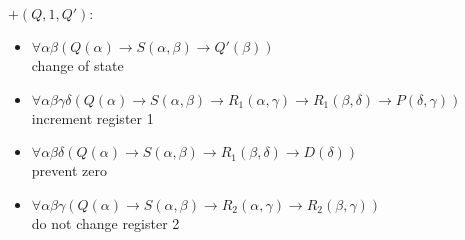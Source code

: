 $+(Q,1,Q'):$
\begin{itemize}
\item $\forall\alpha\beta(Q(\alpha)\to S(\alpha,\beta)\to Q'(\beta))$ \\change of state
\item $\forall\alpha\beta\gamma\delta(Q(\alpha)\to S(\alpha,\beta)\to R_1(\alpha,\gamma)\to R_1(\beta,\delta)\to P(\delta,\gamma))$\\increment register 1
\item $\forall\alpha\beta\delta(Q(\alpha)\to S(\alpha,\beta)\to R_1(\beta,\delta)\to D(\delta))$ \\prevent zero
\item $\forall\alpha\beta\gamma(Q(\alpha)\to S(\alpha,\beta)\to R_2(\alpha,\gamma)\to R_2(\beta,\gamma))$ \\do not change register 2
\end{itemize}


